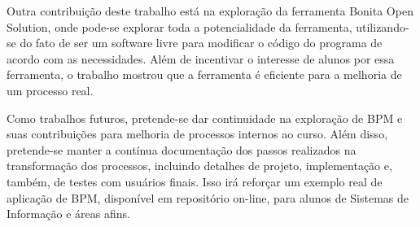 \documentclass[12pt]{article}
\begin{document}
Outra contribuição deste trabalho está na exploração da ferramenta Bonita Open Solution, onde pode-se explorar toda a potencialidade da ferramenta, utilizando-se do fato de ser um software livre para modificar o código do programa de acordo com as necessidades. Além de incentivar o interesse de alunos por essa ferramenta, o trabalho mostrou que a ferramenta é eficiente para a melhoria de um processo real.

Como trabalhos futuros, pretende-se dar continuidade na exploração de BPM e suas contribuições para melhoria de processos internos ao curso. Além disso, pretende-se manter a contínua documentação dos passos realizados na transformação dos processos, incluindo detalhes de projeto, implementação e, também, de testes com usuários finais. Isso irá reforçar um exemplo real de aplicação de BPM, disponível em repositório on-line, para alunos de Sistemas de Informação e áreas afins.




\end{document}
